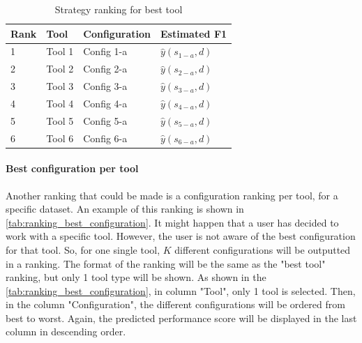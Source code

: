 \begin{table}[h]
\centering
\begin{tabular}{|l|l|l|l|}
\hline
\textbf{Rank} & \textbf{Tool} & \textbf{Configuration} & \textbf{Estimated F1} \\ \hline
1             & Tool 1        & Config 1-a             & $\hat{y}(s_{1-a}, d)$ \\ \hline
2             & Tool 2        & Config 2-a             & $\hat{y}(s_{2-a}, d)$ \\ \hline
3             & Tool 3        & Config 3-a             & $\hat{y}(s_{3-a}, d)$ \\ \hline
4             & Tool 4        & Config 4-a             & $\hat{y}(s_{4-a}, d)$ \\ \hline
5             & Tool 5        & Config 5-a             & $\hat{y}(s_{5-a}, d)$ \\ \hline
6             & Tool 6        & Config 6-a             & $\hat{y}(s_{6-a}, d)$ \\ \hline
\end{tabular}
\caption{Strategy ranking for best tool}
\label{tab:ranking_best_tool}
\end{table}

\paragraph{Best configuration per tool} Another ranking that could be made is a configuration ranking per tool, for a specific dataset. An example of this ranking is shown in \autoref{tab:ranking_best_configuration}. It might happen that a user has decided to work with a specific tool. However, the user is not aware of the best configuration for that tool. So, for one single tool, $K$ different configurations will be outputted in a ranking. The format of the ranking will be the same as the "best tool" ranking, but only 1 tool type will be shown. As shown in the \autoref{tab:ranking_best_configuration}, in column "Tool", only 1 tool is selected. Then, in the column "Configuration", the different configurations will be ordered from best to worst. Again, the predicted performance score will be displayed in the last column in descending order. 

